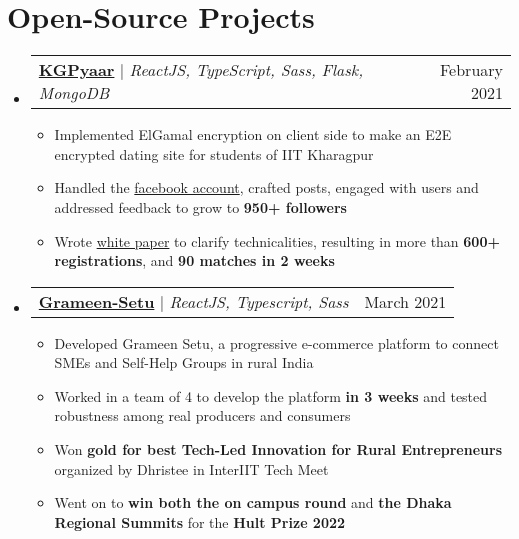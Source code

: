 \documentclass[letterpaper,11pt]{article}
\makeatletter
\newcommand{\resumeItem}[1]{
  \item\small{
    {#1 \vspace{-2pt}}
  }
}
\newcommand{\resumeProjectHeading}[2]{
    \item
    \begin{tabular*}{0.97\textwidth}{l@{\extracolsep{\fill}}r}
      \small#1 & \small #2\\
    \end{tabular*}\vspace{-7pt}
}
\newcommand{\resumeSubHeadingListStart}{\begin{itemize}[leftmargin=0.0in, label={}]}
\newcommand{\resumeSubHeadingListEnd}{\end{itemize}}
\newcommand{\resumeItemListStart}{\begin{itemize}}
\newcommand{\resumeItemListEnd}{\end{itemize}\vspace{-5pt}}
\makeatother
\begin{document}
\section{Open-Source Projects}
%
\resumeSubHeadingListStart
\resumeProjectHeading
{\textbf{\href{https://github.com/kgpyaar-tech?tab=repositories}{KGPyaar}} $|$ \emph{ReactJS, TypeScript, Sass, Flask, MongoDB}}{February 2021}
\resumeItemListStart
\resumeItem{Implemented ElGamal encryption on client side to make an E2E encrypted dating site for students of IIT Kharagpur}
\resumeItem{Handled the \href{https://www.facebook.com/KGPyaar}{facebook account}, crafted posts, engaged with users and addressed feedback to grow to \textbf{950+ followers}}
\resumeItem{Wrote \href{https://bit.ly/KGPyaar-Doc}{white paper} to clarify technicalities, resulting in more than \textbf{600+ registrations}, and \textbf{90 matches in 2 weeks}}
\resumeItemListEnd
\resumeProjectHeading
{\textbf{\href{https://github.com/InterEyeEyeTea2021/frontend}{Grameen-Setu}} $|$ \emph{ReactJS, Typescript, Sass}}{March 2021}
\resumeItemListStart
\resumeItem{Developed Grameen Setu, a progressive e-commerce platform to connect SMEs and Self-Help Groups in rural India}
\resumeItem{Worked in a team of 4 to develop the platform \textbf{in 3 weeks} and tested robustness among real producers and consumers}
\resumeItem{Won \textbf{gold for best Tech-Led Innovation for Rural Entrepreneurs} organized by Dhristee in InterIIT Tech Meet}
\resumeItem{Went on to \textbf{win both the on campus round} and \textbf{the Dhaka Regional Summits} for the \textbf{Hult Prize 2022}}
\resumeItemListEnd
\resumeSubHeadingListEnd
%
\end{document}
